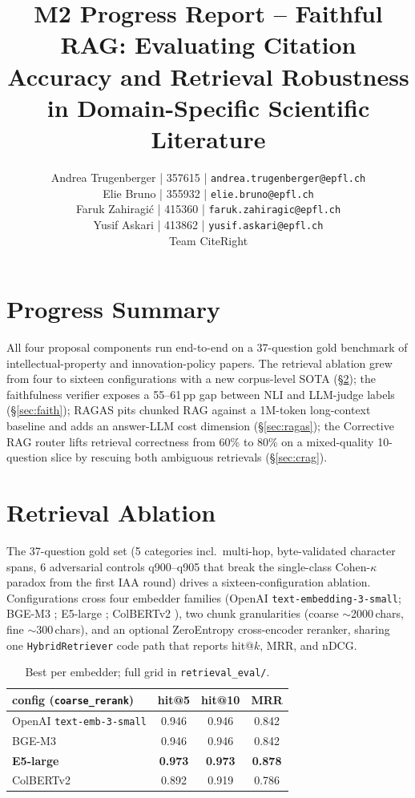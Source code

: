 \documentclass[11pt]{article}
\title{M2 Progress Report -- Faithful RAG: Evaluating Citation Accuracy and Retrieval Robustness in Domain-Specific Scientific Literature}
\author{\normalfont
Andrea Trugenberger | 357615 | \texttt{andrea.trugenberger@epfl.ch} \\
Elie Bruno | 355932 | \texttt{elie.bruno@epfl.ch} \\
Faruk Zahiragi\'c | 415360 | \texttt{faruk.zahiragic@epfl.ch} \\
Yusif Askari | 413862 | \texttt{yusif.askari@epfl.ch} \\
Team CiteRight \\
}
\begin{document}
\maketitle
\thispagestyle{fancy}

\section{Progress Summary}

All four proposal components run end-to-end on a 37-question gold benchmark of intellectual-property and innovation-policy papers. The retrieval ablation grew from four to sixteen configurations with a new corpus-level SOTA (\S\ref{sec:retrieval}); the faithfulness verifier exposes a 55--61\,pp gap between NLI and LLM-judge labels (\S\ref{sec:faith}); RAGAS pits chunked RAG against a 1M-token long-context baseline and adds an answer-LLM cost dimension (\S\ref{sec:ragas}); the Corrective RAG router lifts retrieval correctness from 60\% to 80\% on a mixed-quality 10-question slice by rescuing both ambiguous retrievals (\S\ref{sec:crag}).

\section{Retrieval Ablation}
\label{sec:retrieval}

The 37-question gold set (5 categories incl.\ multi-hop, byte-validated character spans, 6 adversarial controls q900--q905 that break the single-class Cohen-$\kappa$ paradox \citep{cohen1960kappa} from the first IAA round) drives a sixteen-configuration ablation. Configurations cross four embedder families (OpenAI \texttt{text-embedding-3-small}; BGE-M3 \citep{chen2024bgem3}; E5-large \citep{wang2024e5}; ColBERTv2 \citep{santhanam2022colbertv2}), two chunk granularities (coarse $\sim$2000\,chars, fine $\sim$300\,chars), and an optional ZeroEntropy cross-encoder reranker, sharing one \texttt{HybridRetriever} code path that reports hit@$k$, MRR, and nDCG.

\begin{table}[h]
\centering
\footnotesize
\begin{tabular}{lccc}
\toprule
config (\texttt{coarse\_rerank}) & hit@5 & hit@10 & MRR \\
\midrule
OpenAI \texttt{text-emb-3-small}     & 0.946          & 0.946          & 0.842 \\
BGE-M3                                & 0.946          & 0.946          & 0.842 \\
\textbf{E5-large}                     & \textbf{0.973} & \textbf{0.973} & \textbf{0.878} \\
ColBERTv2                             & 0.892          & 0.919          & 0.786 \\
\bottomrule
\end{tabular}
\caption{Best per embedder; full grid in \texttt{retrieval\_eval/}.}
\label{tab:retrieval}
\end{table}
\end{document}
